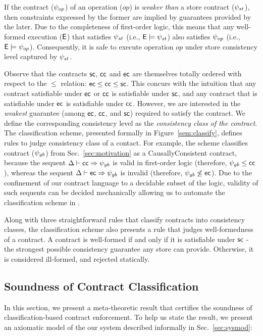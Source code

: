 If the contract ($\psi_{op}$) of an operation ($\mathit{op}$) is \emph{weaker
than} a store contract ($\psi_{st}$), then constraints expressed by the
former are implied by guarantees provided by the later. Due to the
completeness of first-order logic\cite{completeness}, this means that
any well-formed execution (${\normalfont \textsf{E}}$) that satisfies $\psi_{st}$ (i.e.,
${\normalfont \textsf{E}}\models \psi_{st}$) also satisfies $\psi_{op}$ (i.e., ${\normalfont \textsf{E}} \models
\psi_{op}$). Consequently, it is safe to execute operation $\mathit{op}$ under
store consistency level captured by $\psi_{st}$.

Observe that the contracts ${\sf sc}$, ${\sf cc}$ and ${\sf ec}$ are themselves
totally ordered with respect to the $\le$ relation: ${\sf ec} \le {\sf cc} \le
{\sf sc}$.  This concurs with the intuition that any contract satisfiable
under ${\sf ec}$ or ${\sf cc}$ is satisfiable under ${\sf sc}$, and any contract
that is satisfiable under ${\sf ec}$ is satisfiable under ${\sf cc}$. However,
we are interested in the \emph{weakest} guarantee (among ${\sf ec}$,
${\sf cc}$, and ${\sf sc}$) required to satisfy the contract. We define the
corresponding consistency level as the \emph{consistency class of the
contract}. The classification scheme, presented formally in
Figure~\ref{sem:classify}, defines rules to judge consistency class of
a contact. For example, the scheme classifies  contract
($\psi_{gb}$) from Sec.~\ref{sec:motivation} as a {\sf
CausallyConsistent} contract, because the sequent $\Delta \vdash {\sf cc}
\Rightarrow \psi_{gb}$ is valid in first-order logic (therefore,
$\psi_{gb} \le {\sf cc}$), whereas the sequent $\Delta \vdash {\sf ec}
\Rightarrow \psi_{gb}$ is invalid (therefore, $\psi_{gb} \not\le {\sf ec}$).
Due to the confinement of our contract language to a decidable subset
of the logic, validity of such sequents can be decided mechanically
allowing us to automate the classification scheme in \name.

Along with three straightforward rules that classify contracts into
consistency classes, the classification scheme also presents a rule
that judges well-formedness of a contract. A contract is well-formed
if and only if it is satisfiable under ${\sf sc}$ - the strongest possible
consistency guarantee any store can provide. Otherwise, it is
considered ill-formed, and rejected statically.

\subsection{Soundness of Contract Classification}

In this section, we present a meta-theoretic result that certifies the
soundness of classification-based contract enforcement. To help us
state the result, we present an axiomatic model of the our system
described informally in Sec.~\ref{sec:sysmod}:


